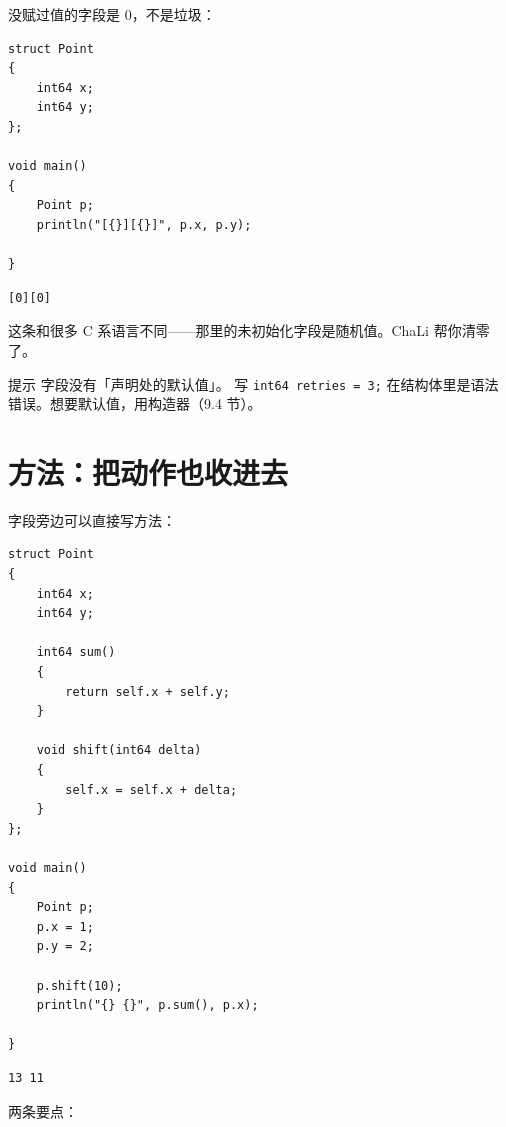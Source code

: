 没赋过值的字段是 0，不是垃圾：

\par
\medskip
\begin{lstlisting}[style=chali]
struct Point
{
    int64 x;
    int64 y;
};

void main()
{
    Point p;
    println("[{}][{}]", p.x, p.y);

}
\end{lstlisting}
\par
\medskip

\par
\medskip
\begin{lstlisting}[style=out]
[0][0]
\end{lstlisting}
\par
\medskip

这条和很多 C 系语言不同——那里的未初始化字段是随机值。ChaLi 帮你清零了。

\begin{tip}{提示}
字段没有「声明处的默认值」。 写 \texttt{int64 retries =\allowbreak{} 3;} 在结构体里是语法错误。想要默认值，用构造器（9.4 节）。
\end{tip}

\section{方法：把动作也收进去}

字段旁边可以直接写方法：

\par
\medskip
\begin{lstlisting}[style=chali]
struct Point
{
    int64 x;
    int64 y;

    int64 sum()
    {
        return self.x + self.y;
    }

    void shift(int64 delta)
    {
        self.x = self.x + delta;
    }
};

void main()
{
    Point p;
    p.x = 1;
    p.y = 2;

    p.shift(10);
    println("{} {}", p.sum(), p.x);

}
\end{lstlisting}
\par
\medskip

\par
\medskip
\begin{lstlisting}[style=out]
13 11
\end{lstlisting}
\par
\medskip

两条要点：

